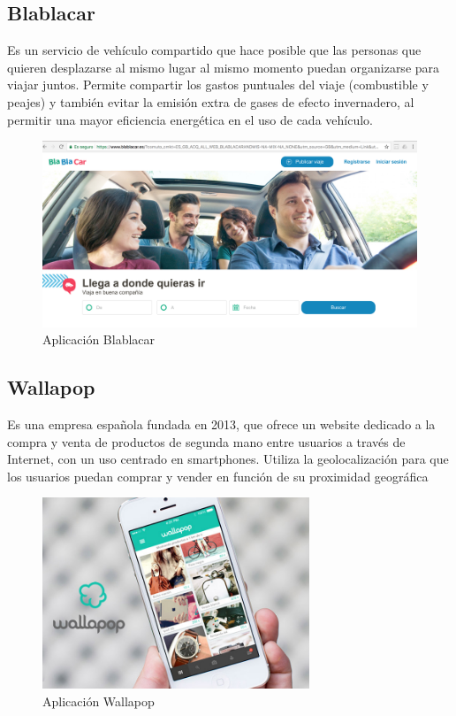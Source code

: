 \subsection{Blablacar}

Es un servicio de vehículo compartido que hace posible que las personas que quieren desplazarse al mismo lugar al mismo momento puedan organizarse para viajar juntos. Permite compartir los gastos puntuales del viaje (combustible y peajes) y también evitar la emisión extra de gases de efecto invernadero, al permitir una mayor eficiencia energética en el uso de cada vehículo.

\begin{figure}[H]
    \centering
    \includegraphics[width=120mm]{memoria/LaTeX/img/introduccion/blablacar.png}
    \caption{Aplicación Blablacar}
\end{figure}

\subsection{Wallapop}

Es una empresa española fundada en 2013, que ofrece un website dedicado a la compra y venta de productos de segunda mano entre usuarios a través de Internet, con un uso centrado en smartphones. Utiliza la geolocalización para que los usuarios puedan comprar y vender en función de su proximidad geográfica

\begin{figure}[H]
    \centering
    \includegraphics[width=80mm]{memoria/LaTeX/img/introduccion/Wallapop-iPhone.jpg}
    \caption{Aplicación Wallapop}
\end{figure}

